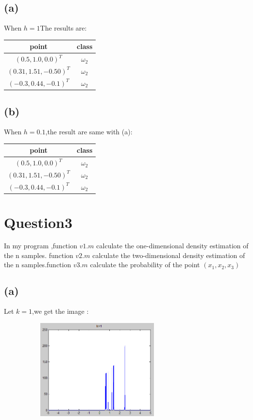 \documentclass[10pt,a4paper]{article}
\begin{document}
\subsection{(a)}
When $h=1$The results are:
\begin{center}
\begin{tabular}{|c|c|}
	\hline point & class  \\ 
	\hline $(0.5,1.0,0.0)^T$ & $\omega_2$  \\ 
	\hline  $(0.31,1.51,-0.50)^T$&$\omega_2$  \\ 
	\hline  $(-0.3,0.44,-0.1)^T$&$\omega_2$  \\ 
	\hline 
\end{tabular} 
\end{center}
\subsection{(b)}
When $h=0.1$,the result are same with (a):
\begin{center}
	\begin{tabular}{|c|c|}
		\hline point & class  \\ 
		\hline $(0.5,1.0,0.0)^T$ & $\omega_2$  \\ 
		\hline  $(0.31,1.51,-0.50)^T$&$\omega_2$  \\ 
		\hline  $(-0.3,0.44,-0.1)^T$&$\omega_2$  \\ 
		\hline 
	\end{tabular} 
\end{center}
\section{Question3}
In my program ,function $v1.m$ calculate the one-dimensional density estimation of the n samples.
function $v2.m$ calculate the two-dimensional density estimation of the n samples.function $v3.m$
calculate the probability of the point $(x_1,x_2,x_3)$ 
\subsection{(a)}
Let $k=1$,we get the image :

\includegraphics[height=2in,width=4in]{1.png}
\end{document}
